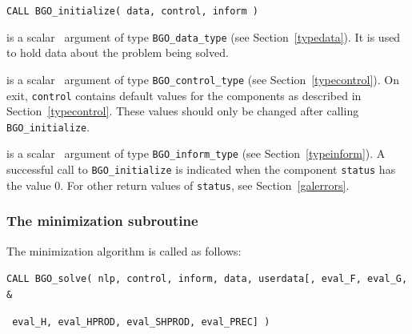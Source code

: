 \documentclass{galahad}
\newcommand{\packagename}{BGO}
\begin{document}
\hspace{8mm}
{\tt CALL \packagename\_initialize( data, control, inform )}

\vspace*{-2mm}
\begin{description}

 is a scalar \intentinout\ argument of type
{\tt \packagename\_data\_type}
(see Section~\ref{typedata}). It is used to hold data about the problem being
solved.

 is a scalar \intentout\ argument of type
{\tt \packagename\_control\_type}
(see Section~\ref{typecontrol}).
On exit, {\tt control} contains default values for the components as
described in Section~\ref{typecontrol}.
These values should only be changed after calling
{\tt \packagename\_initialize}.

 is a scalar \intentout\ argument of type
{\tt \packagename\_inform\_type}
(see Section~\ref{typeinform}). A successful call to
{\tt \packagename\_initialize}
is indicated when the  component {\tt status} has the value 0.
For other return values of {\tt status}, see Section~\ref{galerrors}.

\end{description}


\subsubsection{The minimization subroutine}
The minimization algorithm is called as follows:
\vspace*{1mm}

\hspace{8mm}
{\tt CALL \packagename\_solve( nlp, control, inform, data, userdata[, eval\_F,
eval\_G, \hspace{8mm}                  \&}
\vspace*{-1mm}

\hspace{37mm}
{\tt
eval\_H,  eval\_HPROD, eval\_SHPROD, eval\_PREC] )}
\end{document}
